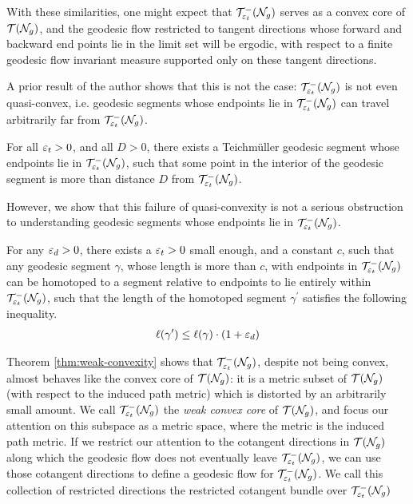 With these similarities, one might expect that $\mathcal{T}_{\varepsilon_t}^{-}(\mathcal{N}_g)$ serves as a convex core of $\mathcal{T}(\mathcal{N}_g)$, and the geodesic flow restricted to tangent directions whose forward and backward end points lie in the limit set will be ergodic, with respect to a finite geodesic flow invariant measure supported only on these tangent directions.

A prior result of the author shows that this is not the case: $\mathcal{T}_{\varepsilon_t}^{-}(\mathcal{N}_g)$ is not even quasi-convex, i.e. geodesic segments whose endpoints lie in $\mathcal{T}_{\varepsilon_t}^{-}(\mathcal{N}_g)$ can travel arbitrarily far from $\mathcal{T}_{\varepsilon_t}^{-}(\mathcal{N}_g)$.

\begin{theorem}
  For all $\varepsilon_t > 0$, and all $D > 0$, there exists a Teichmüller geodesic segment whose endpoints lie in $\mathcal{T}_{\varepsilon_t}^{-}(\mathcal{N}_g)$, such that some point in the interior of the geodesic segment is more than distance $D$ from $\mathcal{T}_{\varepsilon_t}^{-}(\mathcal{N}_g)$.
\end{theorem}

However, we show that this failure of quasi-convexity is not a serious obstruction to understanding geodesic segments whose endpoints lie in $\mathcal{T}_{\varepsilon_t}^{-}(\mathcal{N}_g)$.

\begingroup
\def\thetheorem{\ref{thm:weak-convexity}}
\begin{theorem}
  For any $\varepsilon_d > 0$, there exists a $\varepsilon_t > 0$ small enough, and a constant $c$, such that any geodesic segment $\gamma$, whose length is more than $c$, with endpoints in $\mathcal{T}_{\varepsilon_t}^{-}(\mathcal{N}_g)$ can be homotoped to a segment relative to endpoints to lie entirely within $\mathcal{T}_{\varepsilon_t}^{-}(\mathcal{N}_g)$, such that the length of the homotoped segment $\gamma^{\prime}$ satisfies the following inequality.
  \begin{align*}
    \ell(\gamma^{\prime}) \leq \ell(\gamma) \cdot (1 + \varepsilon_d)
  \end{align*}
\end{theorem}
\addtocounter{theorem}{-1}
\endgroup

Theorem \ref{thm:weak-convexity} shows that $\mathcal{T}_{\varepsilon_t}^{-}(\mathcal{N}_g)$, despite not being convex, almost behaves like the convex core of $\mathcal{T}(\mathcal{N}_g)$: it is a metric subset of $\mathcal{T}(\mathcal{N}_g)$ (with respect to the induced path metric) which is distorted by an arbitrarily small amount.
We call $\mathcal{T}_{\varepsilon_t}^{-}(\mathcal{N}_g)$ the \emph{weak convex core} of $\mathcal{T}(\mathcal{N}_g)$, and focus our attention on this subspace as a metric space, where the metric is the induced path metric.
If we restrict our attention to the cotangent directions in $\mathcal{T}(\mathcal{N}_g)$ along which the geodesic flow does not eventually leave $\mathcal{T}_{\varepsilon_t}^{-}(\mathcal{N}_g)$, we can use those cotangent directions to define a geodesic flow for $\mathcal{T}_{\varepsilon_t}^{-}(\mathcal{N}_g)$.
We call this collection of restricted directions the restricted cotangent bundle over $\mathcal{T}_{\varepsilon_t}^{-}(\mathcal{N}_g)$

